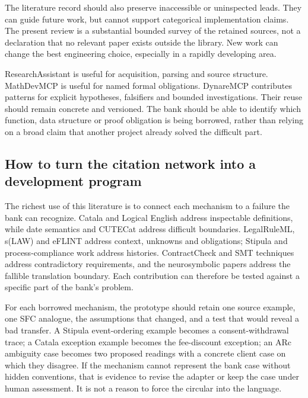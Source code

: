 The literature record should also preserve inaccessible or uninspected leads.
They can guide future work, but cannot support categorical implementation claims.
The present review is a substantial bounded survey of the retained sources,
not a declaration that no relevant paper exists outside the library. New work can
change the best engineering choice, especially in a rapidly developing area.

ResearchAssistant is useful for acquisition, parsing and source structure.
MathDevMCP is useful for named formal obligations. DynareMCP contributes patterns
for explicit hypotheses, falsifiers and bounded investigations. Their reuse
should remain concrete and versioned. The bank should be able to identify which
function, data structure or proof obligation is being borrowed, rather than
relying on a broad claim that another project already solved the difficult part.

\subsection{How to turn the citation network into a development program}
\label{merge:P-02-literature:09}


The richest use of this literature is to connect each mechanism to a failure the
bank can recognize. Catala and Logical English address inspectable definitions,
while date semantics and CUTECat address difficult boundaries. LegalRuleML,
s(LAW) and eFLINT address context, unknowns and obligations; Stipula and
process-compliance work address histories. ContractCheck and SMT techniques
address contradictory requirements, and the neurosymbolic papers address the
fallible translation boundary. Each contribution can therefore be tested against
a specific part of the bank's problem.

For each borrowed mechanism, the prototype should retain one source example,
one SFC analogue, the assumptions that changed, and a test that would reveal a
bad transfer. A Stipula event-ordering example becomes a consent-withdrawal trace;
a Catala exception example becomes the fee-discount exception; an ARc ambiguity
case becomes two proposed readings with a concrete client case on which they
disagree. If the mechanism cannot represent the bank case without hidden
conventions, that is evidence to revise the adapter or keep the case under human
assessment. It is not a reason to force the circular into the language.

